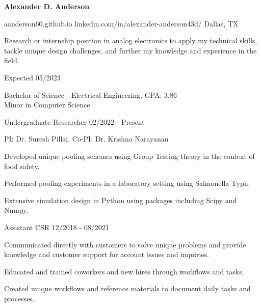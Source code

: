 \documentclass[11pt]{article}
\begin{document}
\centerline{{\Huge \bf Alexander D. Anderson}}

\bigskip

        {aanderson60.github.io}
        {linkedin.com/in/alexander-anderson43d/}
        {Dallas, TX}

Research or internship position in analog electronics to apply my technical skills, tackle unique design challenges, and further my knowledge and experience in the field.


\begin{description}
\squish
{}
            {}
            {Expected 05/2023}

Bachelor of Science - Electrical Engineering, GPA: 3.86\\
Minor in Computer Science 

\end{description}


\begin{description}
\squish

           {Undergraduate Researcher}
           {02/2022 - Present} 

PI: Dr. Suresh Pillai, Co-PI: Dr. Krishna Narayanan

Developed unique pooling schemes using Group Testing theory in the context of food safety.

Performed pooling experiments in a laboratory setting using Salmonella Typh.

Extensive simulation design in Python using packages including Scipy and Numpy.

           {Assistant CSR}
           {12/2018 - 08/2021}

Communicated directly with customers to solve unique problems and provide knowledge and
customer support for account issues and inquiries.

Educated and trained coworkers and new hires through workflows and tasks.

Created unique workflows and reference materials to document daily tasks and processes.

\end{description}
\end{document}
